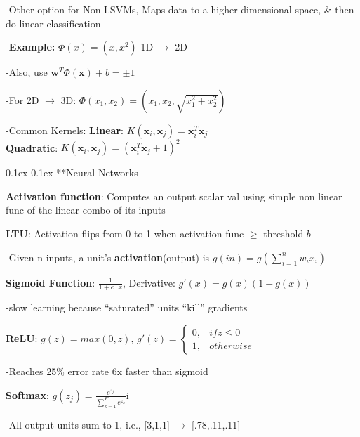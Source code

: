 \documentclass[10pt,landscape]{article}
\makeatletter
\renewcommand{\section}{\@startsection{section}{1}{0mm}%
                                {0.1ex}%
                                {0.1ex}%
                                {\normalfont\normalsize\bfseries}}
\makeatother
\begin{document}
\begin{multicols}{3}
-Other option for Non-LSVMs, Maps data to a higher dimensional space, \& then do linear classification

-\textbf{Example:} $\Phi(x) = (x, x^2)$ 1D $\to$ 2D

-Also, use $\textbf{w}^T\Phi(\textbf{x}) + b = \pm1$

-For 2D $\to$ 3D: $\Phi(x_1,x_2) = (x_1,x_2,\sqrt{x_1^2 + x_2^2})$

\begin{tabbing}
-Common Kernels: \= \textbf{Linear}: $K(\textbf{x}_i,\textbf{x}_j) = \textbf{x}_i^T\textbf{x}_j$\\

\>\textbf{Quadratic}: $K(\textbf{x}_i,\textbf{x}_j) = (\textbf{x}_i^T\textbf{x}_j + 1)^2$\\
\end{tabbing}
\section{**Neural Networks}
   
\textbf{Activation function}: Computes an output scalar val using simple non linear func of the linear combo of its inputs

\textbf{LTU}: Activation flips from 0 to 1 when activation func $\ge$ threshold $b$

-Given n inputs, a unit's \textbf{activation}(output) is $g(in) = g(\sum_{i=1}^{n} w_i x_i)$

\textbf{Sigmoid Function}: $\frac{1}{1+e^-x}$, Derivative: $g'(x) = g(x)(1-g(x))$

-slow learning because ``saturated'' units ``kill'' gradients

\textbf{ReLU}: $g(z) = max(0,z)$, $g'(z) = \begin{cases} 0, & if z \le 0\\1, & otherwise\end{cases}$

-Reaches 25\% error rate 6x faster than sigmoid

\textbf{Softmax}: $g(z_j) = \frac{e^{z_j}}{\sum_{k=1}^{K}e^{z_k}}$i

-All output units sum to 1, i.e., [3,1,1] $\to$ [.78,.11,.11]


\end{multicols}
\end{document}
